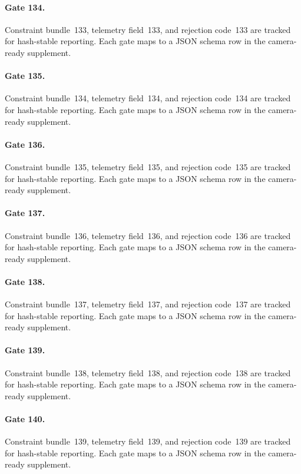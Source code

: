 \documentclass[sigconf,nonacm]{acmart}
\begin{document}
\paragraph{Gate 134.}
Constraint bundle~133, telemetry field~133, and rejection code~133 are tracked for hash-stable reporting. Each gate maps to a JSON schema row in the camera-ready supplement. %

\paragraph{Gate 135.}
Constraint bundle~134, telemetry field~134, and rejection code~134 are tracked for hash-stable reporting. Each gate maps to a JSON schema row in the camera-ready supplement. %

\paragraph{Gate 136.}
Constraint bundle~135, telemetry field~135, and rejection code~135 are tracked for hash-stable reporting. Each gate maps to a JSON schema row in the camera-ready supplement. %

\paragraph{Gate 137.}
Constraint bundle~136, telemetry field~136, and rejection code~136 are tracked for hash-stable reporting. Each gate maps to a JSON schema row in the camera-ready supplement. %

\paragraph{Gate 138.}
Constraint bundle~137, telemetry field~137, and rejection code~137 are tracked for hash-stable reporting. Each gate maps to a JSON schema row in the camera-ready supplement. %

\paragraph{Gate 139.}
Constraint bundle~138, telemetry field~138, and rejection code~138 are tracked for hash-stable reporting. Each gate maps to a JSON schema row in the camera-ready supplement. %

\paragraph{Gate 140.}
Constraint bundle~139, telemetry field~139, and rejection code~139 are tracked for hash-stable reporting. Each gate maps to a JSON schema row in the camera-ready supplement. %
\end{document}
